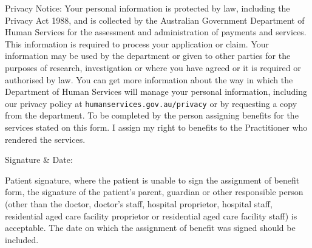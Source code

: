 \documentclass[12pt]{article}
\begin{document}
\begin{spacing}{0.3}

{\tiny
Privacy Notice: Your personal information is protected by law, including the Privacy Act 1988, and is collected by the Australian Government Department of Human Services for the assessment and administration of payments and services. This information is required to process your application or claim. 
Your information may be used by the department or given to other parties for the purposes of research, investigation or where you have agreed or it is required or authorised by law. 
You can get more information about the way in which the Department of Human Services will manage your personal information, including our privacy policy at \texttt{humanservices.gov.au/privacy} or by requesting a copy from the department. 
To be completed by the person assigning benefits for the services stated on this form. I assign my right to benefits to the Practitioner who rendered the services. }

\vspace{7mm}

Signature \& Date:

\vspace{1.5cm}



{\tiny Patient signature, where the patient is unable to sign the assignment of benefit form, the signature of the patient's parent, guardian or other responsible person (other than the doctor, doctor's staff, hospital proprietor, hospital staff, residential aged care facility proprietor or residential aged care facility staff) is acceptable. 
The date on which the assignment of benefit was signed should be included.}

                            \end{spacing}
\end{document}

